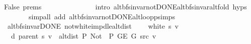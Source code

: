 \begin{isabellebody}
\ False\ {\isachardoublequoteopen}{}{\isachardot}{\kern0pt}prems{\isachardoublequoteclose}{\isacharparenleft}{\kern0pt}{}{\isacharparenright}{\kern0pt}\isanewline
\ \ \ \ \ \ \isamarkupfalse%
\isanewline
\ \ \ \ \ \ \ \ {\isacharparenleft}{\kern0pt}intro\ alt{\isacharunderscore}{\kern0pt}bfs{\isacharunderscore}{\kern0pt}invar{\isacharunderscore}{\kern0pt}not{\isacharunderscore}{\kern0pt}DONE{\isachardot}{\kern0pt}alt{\isacharunderscore}{\kern0pt}bfs{\isacharunderscore}{\kern0pt}invar{\isacharunderscore}{\kern0pt}alt{\isacharunderscore}{\kern0pt}fold\ {\isachardoublequoteopen}{}{\isachardot}{\kern0pt}hyps{\isachardoublequoteclose}{\isacharparenright}{\kern0pt}\isanewline
\ \ \ \ \ \ \ \ {\isacharparenleft}{\kern0pt}simp{\isacharunderscore}{\kern0pt}all\ add{\isacharcolon}{\kern0pt}\ alt{\isacharunderscore}{\kern0pt}bfs{\isacharunderscore}{\kern0pt}invar{\isacharunderscore}{\kern0pt}not{\isacharunderscore}{\kern0pt}DONE{\isachardot}{\kern0pt}alt{\isacharunderscore}{\kern0pt}loop{\isacharunderscore}{\kern0pt}psimps{\isacharparenright}{\kern0pt}\isanewline
\ \ \isamarkupfalse%
\isanewline
{}\isamarkupfalse%
%
\endisatagproof
{\isafoldproof}%
%
\isadelimproof
%
\endisadelimproof
%
\isadelimdocument
%
\endisadelimdocument
%
\isatagdocument
%
\isamarkuptrue%
%
\endisatagdocument
{\isafolddocument}%
%
\isadelimdocument
%
\endisadelimdocument
{}\isamarkupfalse%
\ {\isacharparenleft}{\kern0pt}\ alt{\isacharunderscore}{\kern0pt}bfs{\isacharunderscore}{\kern0pt}invar{\isacharunderscore}{\kern0pt}DONE{\isacharparenright}{\kern0pt}\ not{\isacharunderscore}{\kern0pt}white{\isacharunderscore}{\kern0pt}imp{\isacharunderscore}{\kern0pt}d{\isacharunderscore}{\kern0pt}le{\isacharunderscore}{\kern0pt}alt{\isacharunderscore}{\kern0pt}dist{\isacharcolon}{\kern0pt}\isanewline
\ \ \ {\isachardoublequoteopen}{\isasymnot}\ white\ s\ v{\isachardoublequoteclose}\isanewline
\ \ \ {\isachardoublequoteopen}d\ {\isacharparenleft}{\kern0pt}parent\ s{\isacharparenright}{\kern0pt}\ v\ {\isasymle}\ alt{\isacharunderscore}{\kern0pt}dist\ P{\isacharprime}{\kern0pt}{\isacharprime}{\kern0pt}\ {\isacharparenleft}{\kern0pt}Not\ {\isasymcirc}\ P{\isacharprime}{\kern0pt}{\isacharprime}{\kern0pt}{\isacharparenright}{\kern0pt}\ {\isacharparenleft}{\kern0pt}G{\isachardot}{\kern0pt}E\ G{\isacharparenright}{\kern0pt}\ src\ v{\isachardoublequoteclose}\isanewline
%
\isadelimproof
%
\endisadelimproof
%
\isatagproof
{}\isamarkupfalse%

\end{isabellebody}
